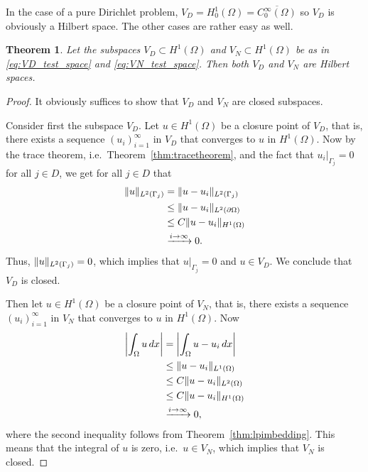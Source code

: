 \documentclass[english, 12pt, a4paper, sci, utf8, a-2b, online]{aaltothesis}
\theoremstyle{definition}
\theoremstyle{plain}
\newtheorem{theorem}{Theorem}[section]
\DeclarePairedDelimiter\abs{\lvert}{\rvert}
\DeclarePairedDelimiter\norm{\lVert}{\rVert}
\newcommand*\diff{\mathop{}\!d}
\numberwithin{equation}{section}
\begin{document}
In the case of a pure Dirichlet problem,
$V_D = H_0^1(\Omega) = \overline{C_0^{\infty}(\Omega)}$
so $V_D$ is obviously a Hilbert space. The other cases are rather easy as well.
\begin{theorem}
    \label{thm:test_spaces_are_hilbert_spaces}
    Let the subspaces $V_D \subset H^1(\Omega)$ and $V_N \subset H^1(\Omega)$
    be as in \eqref{eq:VD_test_space} and \eqref{eq:VN_test_space}.
    Then both $V_D$ and $V_N$ are Hilbert spaces.
\end{theorem}
\begin{proof}
    It obviously suffices to show that $V_D$ and $V_N$ are closed subspaces.

    Consider first the subspace $V_D$.
    Let $u \in H^1(\Omega)$ be a closure point of $V_D$, that is,
    there exists a sequence $(u_i)_{i=1}^{\infty}$ in $V_D$ that converges
    to $u$ in $H^1(\Omega)$. Now by the trace theorem,
    i.e.\ Theorem~\ref{thm:tracetheorem}, and the fact that $u_i|_{\Gamma_j} = 0$
    for all $j \in D$, we get for all $j \in D$ that
    \begin{align*}
        \norm{u}_{L^2(\Gamma_j)}
        &= \norm{u - u_i}_{L^2(\Gamma_j)} \\
        &\leq \norm{u - u_i}_{L^2(\partial \Omega)} \\
        &\leq C \norm{u - u_i}_{H^1(\Omega)} \\
        &\xrightarrow[]{i \to \infty} 0.
    \end{align*}
    Thus, $\norm{u}_{L^2(\Gamma_j)} = 0$, which implies that
    $u|_{\Gamma_j} = 0$ and $u \in V_D$.
    We conclude that $V_D$ is closed.

    Then let $u \in H^1(\Omega)$ be a closure point of $V_N$, that is,
    there exists a sequence $(u_i)_{i=1}^{\infty}$ in $V_N$ that converges
    to $u$ in $H^1(\Omega)$. Now
    \begin{align*}
        \abs*{\int_{\Omega} u \diff x}
        &= \abs*{\int_{\Omega} u - u_i \diff x} \\
        &\leq \norm{u - u_i}_{L^1(\Omega)} \\
        &\leq C \norm{u - u_i}_{L^2(\Omega)} \\
        &\leq C \norm{u - u_i}_{H^1(\Omega)} \\
        &\xrightarrow[]{i \to \infty} 0,
    \end{align*}
    where the second inequality follows from Theorem~\ref{thm:lpimbedding}.
    This means that the integral of $u$ is zero, i.e.\ $u \in V_N$,
    which implies that $V_N$ is closed.
\end{proof}
\end{document}
